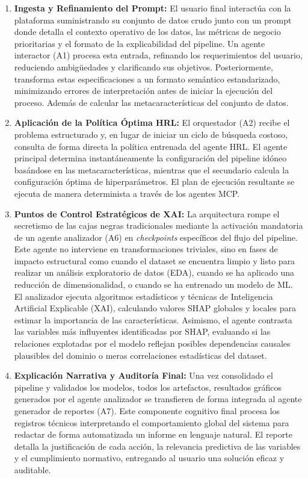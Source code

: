 \documentclass[conference]{IEEEtran}
\begin{document}
\begin{enumerate}
\item \textbf{Ingesta y Refinamiento del Prompt:} El usuario final interactúa con la plataforma suministrando su conjunto de datos crudo junto con un prompt donde detalla el contexto operativo de los datos, las métricas de negocio prioritarias y el formato de la explicabilidad del pipeline. Un agente interactor (A1) procesa esta entrada, refinando los requerimientos del usuario, reduciendo ambigüedades y clarificando sus objetivos. Posteriormente, transforma estas especificaciones a un formato semántico estandarizado, minimizando errores de interpretación antes de iniciar la ejecución del proceso. Además de calcular las metacaracterísticas del conjunto de datos.

\item \textbf{Aplicación de la Política Óptima HRL:} El orquestador (A2) recibe el problema estructurado y, en lugar de iniciar un ciclo de búsqueda costoso, consulta de forma directa la política entrenada del agente HRL. El agente principal determina instantáneamente la configuración del pipeline idóneo basándose en las metacaracterísticas, mientras que el secundario calcula la configuración óptima de hiperparámetros. El plan de ejecución resultante se ejecuta de manera determinista a través de los agentes MCP.

\item \textbf{Puntos de Control Estratégicos de XAI:} La arquitectura rompe el secretismo de las cajas negras tradicionales mediante la activación mandatoria de un agente analizador (A6) en \textit{checkpoints} específicos del flujo del pipeline. Este agente no interviene en transformaciones triviales, sino en fases de impacto estructural como cuando el dataset se encuentra limpio y listo para realizar un análisis exploratorio de datos (EDA), cuando se ha aplicado una reducción de dimensionalidad, o cuando se ha entrenado un modelo de ML. El analizador ejecuta algoritmos estadísticos y técnicas de Inteligencia Artificial Explicable (XAI), calculando valores SHAP globales y locales para estimar la importancia de las características. Asimismo, el agente contrasta las variables más influyentes identificadas por SHAP, evaluando si las relaciones explotadas por el modelo reflejan posibles dependencias causales plausibles del dominio o meras correlaciones estadísticas del dataset.

\item \textbf{Explicación Narrativa y Auditoría Final:} Una vez consolidado el pipeline y validados los modelos, todos los artefactos, resultados gráficos generados por el agente analizador se transfieren de forma integrada al agente generador de reportes (A7). Este componente cognitivo final procesa los registros técnicos interpretando el comportamiento global del sistema para redactar de forma automatizada un informe en lenguaje natural. El reporte detalla la justificación de cada acción, la relevancia predictiva de las variables y el cumplimiento normativo, entregando al usuario una solución eficaz y auditable.

\end{enumerate}
\end{document}
